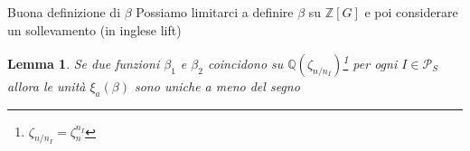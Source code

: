 \documentclass{beamer}
\theoremstyle{plain}
\newtheorem{lem}[teo]{Lemma}
\theoremstyle{remark}
\theoremstyle{definition}
\newcommand{\PS}{\mathcal{P}_S}
\newcommand{\Z}{\mathbb{Z}}
\newcommand{\Q}{\mathbb{Q}}
\begin{document}
	\begin{frame}{Buona definizione di $ \beta $}
		Possiamo limitarci a definire $\beta$ su $ \Z[G] $ e poi considerare un sollevamento (in inglese lift)\\
		\pause
		\begin{lem}
			Se due funzioni $ \beta_1 $ e $ \beta_2 $ coincidono su $ \Q(\zeta_{n/n_I} )$\footnote{$ \zeta_{n/n_I} = \zeta_n^{n_I} $} per ogni $ I \in \PS $ allora le unità $ \xi_a (\beta) $ sono uniche a meno del segno
		\end{lem}
	\end{frame}
	
	
	
	
	
	
	
	
	
\end{document}
